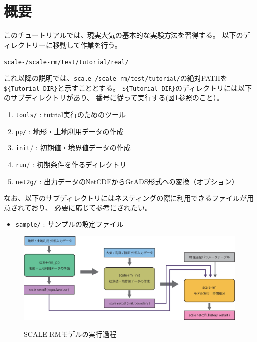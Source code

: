 \section{概要}
\label{sec:tutrial_real_intro}
このチュートリアルでは、現実大気の基本的な実験方法を習得する。
以下のディレクトリーに移動して作業を行う。
\begin{alltt}
 scale-{\version}/scale-rm/test/tutorial/real/
\end{alltt}
これ以降の説明では、\texttt{scale-{\version}/scale-rm/test/tutorial/}の絶対PATHを
\verb|${Tutorial_DIR}|と示すこととする。
\verb|${Tutorial_DIR}|のディレクトリには以下のサブディレクトリがあり、
番号に従って実行する(図\ref{fig:howto}参照のこと）。
\begin{enumerate}
\item  \texttt{tools/}   : tutrial実行のためのツール
\item  \texttt{pp/}      : 地形・土地利用データの作成
\item  \texttt{init}/    : 初期値・境界値データの作成
\item  \texttt{run}/     : 初期条件を作るディレクトリ
\item  \texttt{net2g/}   : 出力データのNetCDFからGrADS形式への変換（オプション） 
\end{enumerate}
なお、以下のサブディレクトリにはネスティングの際に利用できるファイルが用意されており、
必要に応じて参考にされたい。
\begin{itemize}
\item  \texttt{sample/}  : サンプルの設定ファイル
\end{itemize}


\begin{figure}[b]
\begin{center}
  \includegraphics[width=0.9\hsize]{./figure/real_procedure.eps}\\
  \caption{SCALE-RMモデルの実行過程}
  \label{fig:howto}
\end{center}
\end{figure}

